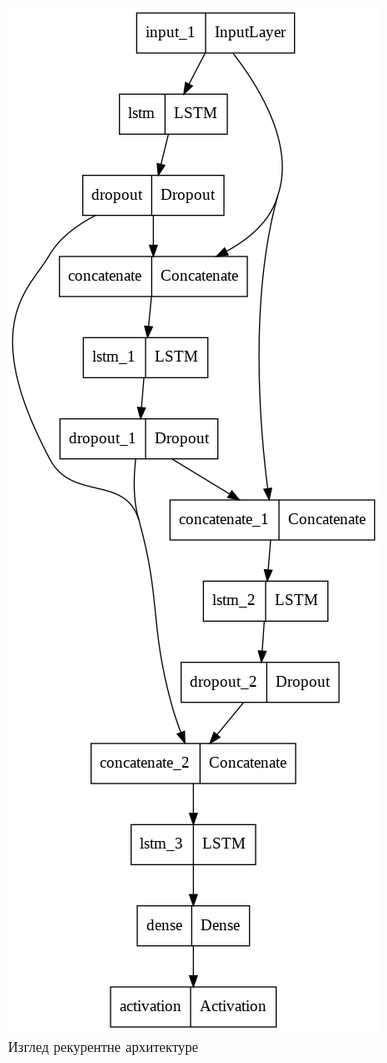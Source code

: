 \documentclass[11pt]{article}
\begin{document}
\begin{figure}[htbp]
\centering
\includegraphics[scale=0.4]{./img/model-lstm.png}
\caption{\label{fig:org61e3d3d}Изглед рекурентне архитектуре}
\end{figure}
\end{document}
